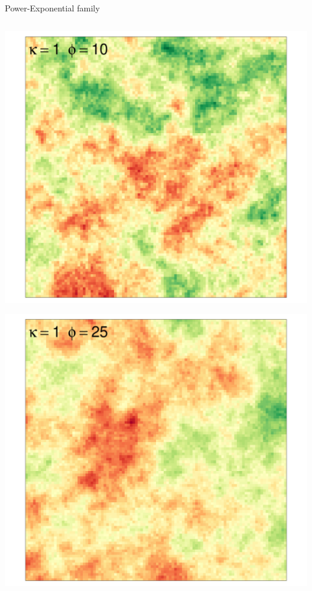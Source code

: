 \documentclass[
  ignorenonframetext,
]{beamer}
\begin{document}
\begin{frame}{Power-Exponential family}
\begin{columns}[T]
\begin{column}{0.33\textwidth}
\includegraphics{Lecture_1_files/figure-beamer/unnamed-chunk-13-1.pdf}

\includegraphics{Lecture_1_files/figure-beamer/unnamed-chunk-14-1.pdf}
\end{column}


\end{columns}
\end{frame}
\end{document}
